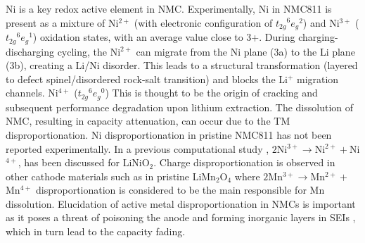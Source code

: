 \documentclass[journal=jacsat,manuscript=article]{achemso}
\begin{document}
Ni is a key redox active element in NMC. Experimentally, Ni in NMC811 is present as a mixture of Ni$^{2+}$ (with electronic configuration of ${t_{2g}}^{6}{e_{g}}^{2}$) and Ni$^{3+}$ (${t_{2g}}^{6}{e_{g}}^{1}$) oxidation states, with an average value close to 3+. \cite{Zhu_JMatChemA2019,Katharina-chemmater,Kondrakov_JPhysChemC2017} 
During charging-discharging cycling, the Ni$^{2+}$  can migrate from the Ni plane (3a) to the Li plane (3b), creating a Li/Ni disorder. \cite{Zhang-acs.chemmater-2019, Feng-2019, Xia2018} This leads to a structural transformation (layered to defect spinel/disordered rock-salt transition) and blocks the Li$^{+}$  migration channels.\cite{Xia2018} Ni$^{4+}$ (${t_{2g}}^{6}{e_{g}}^{0}$) 
This is thought to be the origin of cracking and subsequent performance degradation upon lithium extraction.\cite{Katharina-chemmater,Li-aenm-2019,Li-EER-2020}   
The dissolution of NMC, resulting in capacity attenuation, can occur due to the TM disproportionation.\cite{buchberger2015} 
Ni disproportionation in pristine NMC811 has not been reported experimentally. 
In a previous computational study \cite{HChen_PhysRevB2011}, $2$Ni$^{3+}\rightarrow$Ni$^{2+} + $Ni$^{4+}$, has been discussed for LiNiO$_2$. 
Charge disproportionation is observed in other cathode materials such as in pristine LiMn$_2$O$_4$ where  $2$Mn$^{3+}\rightarrow$Mn$^{2+} + $Mn$^{4+}$ disproportionation is considered to be the main responsible for Mn dissolution. Elucidation of active metal disproportionation in NMCs is important as it poses a threat of poisoning the anode \cite{Parmar-LMO-2020,PASQUALINI2017} and forming inorganic layers in SEIs \cite{joshi2014}, which in turn lead to the capacity fading. 
\end{document}
